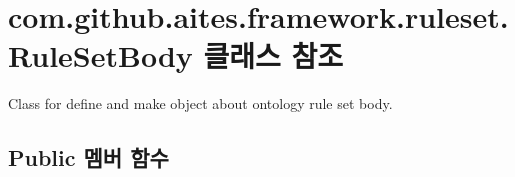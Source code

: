 \hypertarget{classcom_1_1github_1_1aites_1_1framework_1_1ruleset_1_1_rule_set_body}{}\section{com.\+github.\+aites.\+framework.\+ruleset.\+Rule\+Set\+Body 클래스 참조}
\label{classcom_1_1github_1_1aites_1_1framework_1_1ruleset_1_1_rule_set_body}


Class for define and make object about ontology rule set body.  


\subsection*{Public 멤버 함수}
